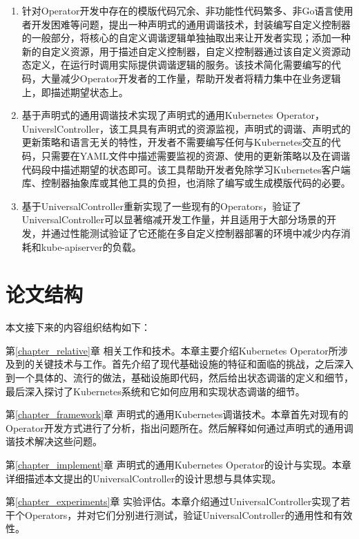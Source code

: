 \documentclass[macfonts,master]{njuthesis}
\begin{document}
\begin{enumerate}
	\item 针对Operator开发中存在的模版代码冗余、非功能性代码繁多、非Go语言使用者开发困难等问题，提出一种声明式的通用调谐技术，封装编写自定义控制器的一般部分，将核心的自定义调谐逻辑单独抽取出来让开发者实现；添加一种新的自定义资源，用于描述自定义控制器，自定义控制器通过该自定义资源动态定义，在运行时调用实际提供调谐逻辑的服务。该技术简化需要编写的代码，大量减少Operator开发者的工作量，帮助开发者将精力集中在业务逻辑上，即描述期望状态上。
	\item 基于声明式的通用调谐技术实现了声明式的通用Kubernetes Operator，UniverslController，该工具具有声明式的资源监视，声明式的调谐、声明式的更新策略和语言无关的特性，开发者不需要编写任何与Kubernetes交互的代码，只需要在YAML文件中描述需要监视的资源、使用的更新策略以及在调谐代码段中描述期望的状态即可。该工具帮助开发者免除学习Kubernetes客户端库、控制器抽象库或其他工具的负担，也消除了编写或生成模版代码的必要。
	\item 基于UniversalController重新实现了一些现有的Operators，验证了UniversalController可以显著缩减开发工作量，并且适用于大部分场景的开发，并通过性能测试验证了它还能在多自定义控制器部署的环境中减少内存消耗和kube-apiserver的负载。
\end{enumerate}


\section{论文结构}
本文接下来的内容组织结构如下：


第\ref{chapter_relative}章 相关工作和技术。本章主要介绍Kubernetes Operator所涉及到的关键技术与工作。首先介绍了现代基础设施的特征和面临的挑战，之后深入到一个具体的、流行的做法，基础设施即代码，然后给出状态调谐的定义和细节，最后深入探讨了Kubernetes系统和它如何应用和实现状态调谐的细节。

第\ref{chapter_framework}章 声明式的通用Kubernetes调谐技术。本章首先对现有的Operator开发方式进行了分析，指出问题所在。然后解释如何通过声明式的通用调谐技术解决这些问题。

第\ref{chapter_implement}章 声明式的通用Kubernetes Operator的设计与实现。本章详细描述本文提出的UniversalController的设计思想与具体实现。

第\ref{chapter_experiments}章 实验评估。本章介绍通过UniversalController实现了若干个Operators，并对它们分别进行测试，验证UniversalController的通用性和有效性。
\end{document}
